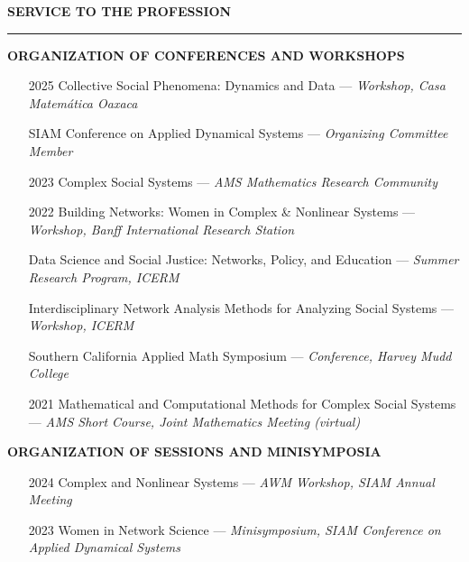 \documentclass{resume} %
\renewenvironment{rSection}[1]{
\sectionskip
\textcolor{WinePurple}{\MakeUppercase{#1}}
\sectionlineskip
\hrule
\begin{list}{}{
\setlength{\leftmargin}{1.5em}
}
\item[]
}{
\end{list}
}
\begin{document}
\begin{rSection}{\bf Service to the Profession}

\medskip

\uppercase{{\bf Organization of Conferences and Workshops}}
\begin{itemize}
    \item[2025]  {Collective Social Phenomena: Dynamics and Data} --- 
    {\em Workshop, Casa Matemática Oaxaca}

    \item[] {SIAM Conference on Applied Dynamical Systems}  --- 
    {\em Organizing Committee Member}

    \item[2023]{Complex Social Systems}  ---
    {\em AMS Mathematics Research Community}

    \item[2022] {Building Networks: Women in Complex \& Nonlinear Systems} --- {\em Workshop, Banff International Research Station}

    \item[] {Data Science and Social Justice: Networks, Policy, and Education} ---
    {\em Summer Research Program, ICERM} 
    
    \item[]
    {Interdisciplinary Network Analysis Methods for Analyzing Social Systems} --- {\em Workshop, ICERM}

    \item[] {Southern California Applied Math Symposium} ---
    {\em Conference, Harvey Mudd College}

    \item[2021] {Mathematical and Computational Methods for Complex Social Systems} ---
    {\em AMS Short Course, Joint Mathematics Meeting (virtual) }
\end{itemize}

\uppercase{{\bf Organization of Sessions and Minisymposia}}
\begin{itemize}
    \item[2024]  {Complex and Nonlinear Systems} ---
    {\em AWM Workshop, SIAM Annual Meeting}

    \item[2023] {Women in Network Science} ---
    {\em Minisymposium, SIAM Conference on Applied Dynamical Systems}


\end{itemize}
\end{rSection}
\end{document}
